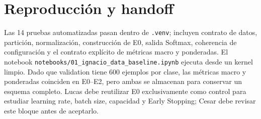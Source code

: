 \documentclass[11pt,a4paper]{article}
\begin{document}
\section{Reproducción y handoff}
Las 14 pruebas automatizadas pasan dentro de \texttt{.venv}; incluyen contrato de datos, partición, normalización, construcción de E0, salida Softmax, coherencia de configuración y el contrato explícito de métricas macro y ponderadas. El notebook \texttt{notebooks/01\_ignacio\_data\_baseline.ipynb} ejecuta desde un kernel limpio. Dado que validation tiene 600 ejemplos por clase, las métricas macro y ponderadas coinciden en E0--E2, pero ambas se almacenan para conservar un esquema completo. Lucas debe reutilizar E0 exclusivamente como control para estudiar learning rate, batch size, capacidad y Early Stopping; Cesar debe revisar este bloque antes de aceptarlo.
\end{document}
